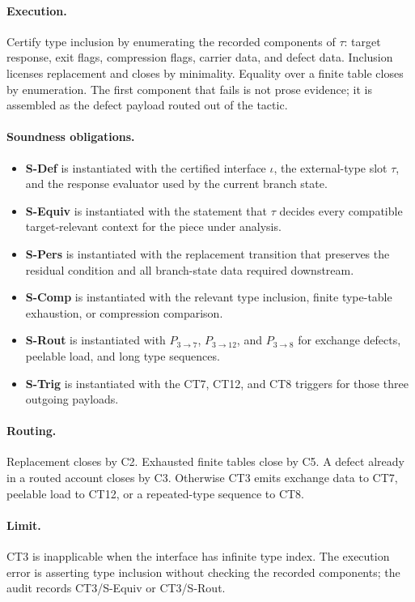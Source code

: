 \documentclass[
  11pt,
]{article}
\providecommand{\tightlist}{%
  \setlength{\itemsep}{0pt}\setlength{\parskip}{0pt}}
\theoremstyle{definition}
\newcommand{\ctpar}[1]{\paragraph{#1.}}
\begin{document}
\ctpar{Execution}
Certify type inclusion by enumerating the recorded components of
\(\tau\): target response, exit flags, compression flags, carrier data,
and defect data.  Inclusion licenses replacement and closes by
minimality.  Equality over a finite table closes by enumeration.  The
first component that fails is not prose evidence; it is assembled as the
defect payload routed out of the tactic.

\ctpar{Soundness obligations}
\begin{itemize}
\tightlist
\item \textbf{S-Def} is instantiated with the certified interface \(\iota\), the external-type slot \(\tau\), and the response evaluator used by the current branch state.
\item \textbf{S-Equiv} is instantiated with the statement that \(\tau\) decides every compatible target-relevant context for the piece under analysis.
\item \textbf{S-Pers} is instantiated with the replacement transition that preserves the residual condition and all branch-state data required downstream.
\item \textbf{S-Comp} is instantiated with the relevant type inclusion, finite type-table exhaustion, or compression comparison.
\item \textbf{S-Rout} is instantiated with \(P_{3\to7}\), \(P_{3\to12}\), and \(P_{3\to8}\) for exchange defects, peelable load, and long type sequences.
\item \textbf{S-Trig} is instantiated with the CT7, CT12, and CT8 triggers for those three outgoing payloads.
\end{itemize}

\ctpar{Routing}
Replacement closes by C2.  Exhausted finite tables close by C5.  A defect
already in a routed account closes by C3.  Otherwise CT3 emits exchange
data to CT7, peelable load to CT12, or a repeated-type sequence to CT8.

\ctpar{Limit}
CT3 is inapplicable when the interface has infinite type index. The
execution error is asserting type inclusion without checking the recorded
components; the audit records CT3/S-Equiv or CT3/S-Rout.
\end{document}
